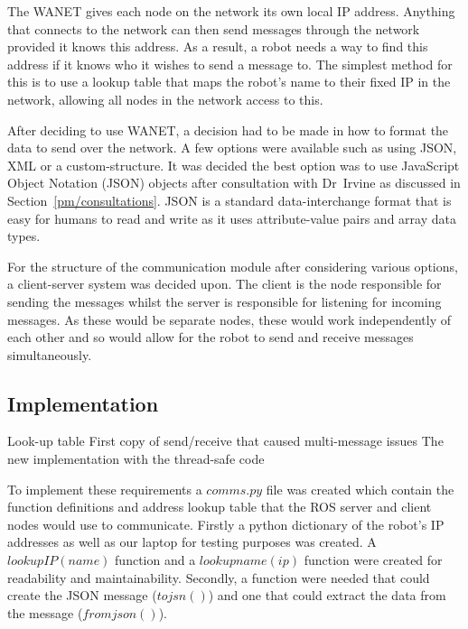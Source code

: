 The WANET gives each node on the network its own local IP address. 
Anything that connects to the network can then send messages through 
the network provided it knows this address. As a result, a robot 
needs a way to find this address if it knows who it wishes to send 
a message to. The simplest method for this is to use a lookup table 
that maps the robot's name to their fixed IP in the network, allowing 
all nodes in the network access to this.

After deciding to use WANET, a decision  had to be made in how to format 
the data to send over the network. A few options were available such as 
using JSON, XML or a custom-structure. It was decided the best option was 
to use JavaScript Object Notation (JSON) objects after consultation with 
Dr~Irvine as discussed in Section~\ref{pm/consultations}. JSON is a 
standard data-interchange format that is easy for humans to read and write 
as it uses attribute-value pairs and array data types.

For the structure of the communication module after considering various options, 
a client-server system was decided upon. The client is the node 
responsible for sending the messages whilst the server is responsible 
for listening for incoming messages. As these would be separate nodes, 
these would work independently of each other and so would allow for the 
robot to send and receive messages simultaneously. 

\subsection{Implementation}\label{soft/comms/impl}
Look-up table
First copy of send/receive that caused multi-message issues
The new implementation with the thread-safe code

To implement these requirements a $comms.py$ file was created which contain 
the function definitions and address lookup table that the ROS server and 
client nodes would use to communicate. Firstly a python dictionary of the 
robot's IP addresses as well as our laptop for testing purposes was created. 
A $lookupIP(name)$ function and a $lookupname(ip)$ function were created for 
readability and maintainability. Secondly, a function were needed that could 
create the JSON message ($tojsn()$) and one that could extract the data from 
the message ($fromjson()$). 

